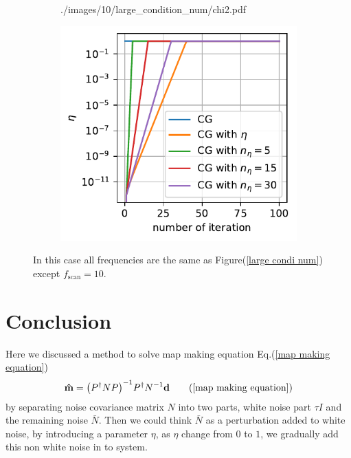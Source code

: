 \documentclass[11pt, letterpaper]{article}
\newcommand{\vbd}{\vb{d}}
\newcommand{\inv}[1]{#1^{-1}}
\newcommand{\hatm}{\vb{\hat{m}}}
\newcommand{\Pdagger}{P^{\dagger}}
\newcommand{\Nbar}{\bar{N}}
\newcommand{\PPinv}[1]{\inv{\qty(\Pdagger #1 P)}}
\begin{document}
\begin{figure}[htb]
\begin{subfigure}{0.33\textwidth}
        {./images/10/large_condition_num/chi2.pdf}
    \caption{}
    \label{large condi num chi2 10}
\end{subfigure}%
\begin{subfigure}{0.33\textwidth}
    \centering
    \includegraphics[width=\linewidth]
        {./images/10/large_condition_num/eta.pdf}
    \caption{}
    \label{large condi num eta 10}
\end{subfigure}
\caption{In this case all frequencies are the same as
    Figure(\ref{large condi num}) except $f_{\text{scan}} = 10$.
}
\label{large condi num 10}
\end{figure}



\section{Conclusion}
Here we discussed a method to solve map making equation
Eq.(\ref{map making equation})
\begin{align}
\hatm = \PPinv{N} \Pdagger \inv{N} \vbd \tag{\ref{map making equation}}
\end{align}
by separating noise covariance matrix $N$ into two parts, white noise part
$\tau I$ and the remaining noise $\Nbar$.
Then we could think $\Nbar$ as a perturbation added to white noise, 
by introducing a parameter $\eta$, as $\eta$ change from $0$ to $1$,
we gradually add this non white noise in to system.
\end{document}
